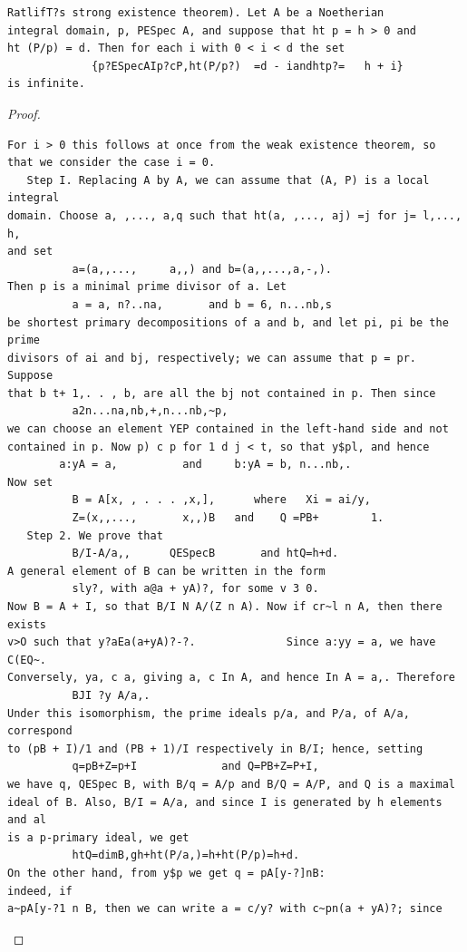 \begin{theorem}\label{mcrt-auto-theorem-31-3}\uses{}
\begin{verbatim}
RatlifT?s strong existence theorem). Let A be a Noetherian
integral domain, p, PESpec A, and suppose that ht p = h > 0 and
ht (P/p) = d. Then for each i with 0 < i < d the set
             {p?ESpecAIp?cP,ht(P/p?)  =d - iandhtp?=   h + i}
is infinite.
\end{verbatim}
\end{theorem}
\begin{proof}
\begin{verbatim}
For i > 0 this follows at once from the weak existence theorem, so
that we consider the case i = 0.
   Step I. Replacing A by A, we can assume that (A, P) is a local integral
domain. Choose a, ,..., a,q such that ht(a, ,..., aj) =j for j= l,..., h,
and set
          a=(a,,...,     a,,) and b=(a,,...,a,-,).
Then p is a minimal prime divisor of a. Let
          a = a, n?..na,       and b = 6, n...nb,s
be shortest primary decompositions of a and b, and let pi, pi be the prime
divisors of ai and bj, respectively; we can assume that p = pr. Suppose
that b t+ 1,. . , b, are all the bj not contained in p. Then since
          a2n...na,nb,+,n...nb,~p,
we can choose an element YEP contained in the left-hand side and not
contained in p. Now p) c p for 1 d j < t, so that y$pl, and hence
        a:yA = a,          and     b:yA = b, n...nb,.
Now set
          B = A[x, , . . . ,x,],      where   Xi = ai/y,
          Z=(x,,...,       x,,)B   and    Q =PB+        1.
   Step 2. We prove that
          B/I-A/a,,      QESpecB       and htQ=h+d.
A general element of B can be written in the form
          sly?, with a@a + yA)?, for some v 3 0.
Now B = A + I, so that B/I N A/(Z n A). Now if cr~l n A, then there exists
v>O such that y?aEa(a+yA)?-?.              Since a:yy = a, we have C(EQ~.
Conversely, ya, c a, giving a, c In A, and hence In A = a,. Therefore
          BJI ?y A/a,.
Under this isomorphism, the prime ideals p/a, and P/a, of A/a, correspond
to (pB + I)/1 and (PB + 1)/I respectively in B/I; hence, setting
          q=pB+Z=p+I             and Q=PB+Z=P+I,
we have q, QESpec B, with B/q = A/p and B/Q = A/P, and Q is a maximal
ideal of B. Also, B/I = A/a, and since I is generated by h elements and al
is a p-primary ideal, we get
          htQ=dimB,gh+ht(P/a,)=h+ht(P/p)=h+d.
On the other hand, from y$p we get q = pA[y-?]nB:                indeed, if
a~pA[y-?1 n B, then we can write a = c/y? with c~pn(a + yA)?; since

\end{verbatim}
\end{proof}
